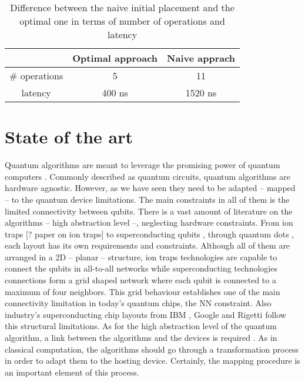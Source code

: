 \begin{table}[htbp]
\caption{\label{tab:orge300e56}
Difference between the naive initial placement and the optimal one in terms of number of operations and latency}
\centering
\begin{tabular}{ccc}
\hline
 & Optimal approach & Naive apprach\\
\hline
\# operations & 5 & 11\\
latency & 400 ns & 1520 ns\\
\hline
\end{tabular}
\end{table}

\section*{State of the art}
\label{sec:orgb96fb09}
Quantum algorithms are meant to leverage the promising power of quantum computers \cite{coles18:quant_algor_implem_begin}.
Commonly described as quantum circuits, quantum algorithms are hardware agnostic.
However, as we have seen they need to be adapted -- mapped -- to the quantum device limitations.
The main constraints in all of them is the limited connectivity between qubits.
There is a vast amount of literature on the algorithms -- high abstraction level --, neglecting hardware constraints.
From ion traps [? paper on ion traps] to superconducting qubits \cite{Barends_2014,Versluis_2017}, through quantum dots \cite{Hill_2015,Li_2018}, each layout has its own requirements and constraints.
Although all of them are arranged in a 2D -- planar -- structure, ion traps technologies are capable to connect the qubits in all-to-all networks while superconducting technologies connections form a grid shaped network where each qubit is connected to a maximum of four neighbors.
This grid behaviour establishes one of the main connectivity limitation in today's quantum chips, the NN constraint.
Also industry's superconducting chip layouts from IBM \cite{IBM_QX}, Google \cite{boixo16:charac_quant_suprem_near_term_devic} and Rigetti \cite{Sete_2016} follow this structural limitations.
As for the high abstraction level of the quantum algorithm, a link between the algorithms and the devices is required \cite{Fu_2016}.
As in classical computation, the algorithms should go through a transformation process in order to adapt them to the hosting device.
Certainly, the mapping procedure is an important element of this process.

